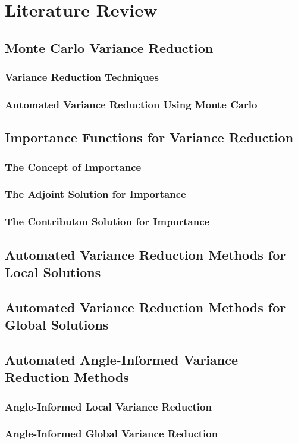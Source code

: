 \chapter{Literature Review}

\section{Monte Carlo Variance Reduction}
\subsection{Variance Reduction Techniques}
\subsection{Automated Variance Reduction Using Monte Carlo}
\section{Importance Functions for Variance Reduction}
\subsection{The Concept of Importance}
\subsection{The Adjoint Solution for Importance}
\subsection{The Contributon Solution for Importance}
\section{Automated Variance Reduction Methods for Local Solutions}
\section{Automated Variance Reduction Methods for Global Solutions}
\section{Automated Angle-Informed Variance Reduction Methods}
\subsection{Angle-Informed Local Variance Reduction}
\subsection{Angle-Informed Global Variance Reduction}

